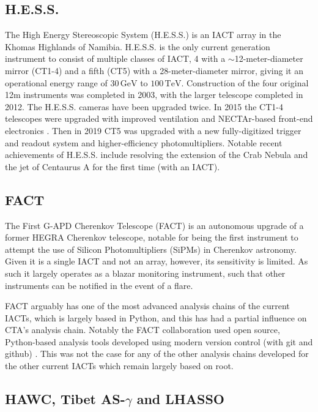 \subsection{H.E.S.S.}
The High Energy Stereoscopic System (H.E.S.S.) is an IACT array in the Khomas Highlands of Namibia. H.E.S.S. is the only current generation instrument to consist of multiple classes of IACT, 4 with a $\sim$12-meter-diameter mirror (CT1-4) and a fifth (CT5) with a 28-meter-diameter mirror, giving it an operational energy range of $\mathrm{30\,GeV}$ to $\mathrm{100\,TeV}$. Construction of the four original 12m instruments was completed in 2003, with the larger telescope completed in 2012. The H.E.S.S. cameras have been upgraded twice. In 2015 the CT1-4 telescopes were upgraded with improved ventilation and NECTAr-based front-end electronics \cite{hess1u}. Then in 2019 CT5 was upgraded with a new fully-digitized trigger and readout system and higher-efficiency photomultipliers. Notable recent achievements of H.E.S.S. include resolving the extension of the Crab Nebula \cite{crabextension} and the jet of Centaurus A \cite{cena} for the first time (with an IACT).

\subsection{FACT}
The First G-APD Cherenkov Telescope (FACT) is an autonomous upgrade of a former HEGRA Cherenkov telescope, notable for being the first instrument to attempt the use of Silicon Photomultipliers (SiPMs) in Cherenkov astronomy. Given it is a single IACT and not an array, however, its sensitivity is limited. As such it largely operates as a blazar monitoring instrument, such that other instruments can be notified in the event of a flare. 

FACT arguably has one of the most advanced analysis chains of the current IACTs, which is largely based in Python, and this has had a partial influence on CTA's analysis chain. Notably the FACT collaboration used open source, Python-based analysis tools developed using modern version control (with git and github) \cite{factspec}. This was not the case for any of the other analysis chains developed for the other current IACTs which remain largely based on root.

\subsection{HAWC, Tibet AS-\ensuremath{\gamma} and LHASSO}

